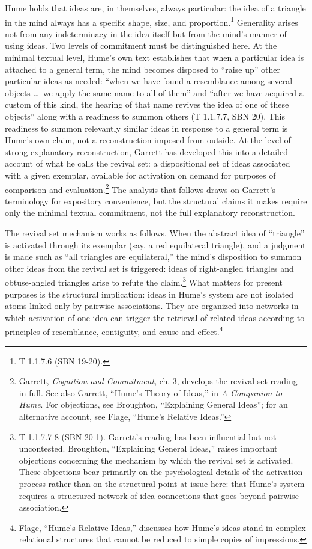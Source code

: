 \documentclass[11pt]{article}
\begin{document}
Hume holds that ideas are, in themselves, always particular: the idea of a triangle in the mind always has a specific shape, size, and proportion.\footnote{T 1.1.7.6 (SBN 19-20).} Generality arises not from any indeterminacy in the idea itself but from the mind's manner of using ideas. Two levels of commitment must be distinguished here. At the minimal textual level, Hume's own text establishes that when a particular idea is attached to a general term, the mind becomes disposed to ``raise up'' other particular ideas as needed: ``when we have found a resemblance among several objects \ldots\ we apply the same name to all of them'' and ``after we have acquired a custom of this kind, the hearing of that name revives the idea of one of these objects'' along with a readiness to summon others (T 1.1.7.7, SBN 20). This readiness to summon relevantly similar ideas in response to a general term is Hume's own claim, not a reconstruction imposed from outside. At the level of strong explanatory reconstruction, Garrett has developed this into a detailed account of what he calls the revival set: a dispositional set of ideas associated with a given exemplar, available for activation on demand for purposes of comparison and evaluation.\footnote{Garrett, \emph{Cognition and Commitment}, ch. 3, develops the revival set reading in full. See also Garrett, ``Hume's Theory of Ideas,'' in \emph{A Companion to Hume}. For objections, see Broughton, ``Explaining General Ideas''; for an alternative account, see Flage, ``Hume's Relative Ideas.''} The analysis that follows draws on Garrett's terminology for expository convenience, but the structural claims it makes require only the minimal textual commitment, not the full explanatory reconstruction.

The revival set mechanism works as follows. When the abstract idea of ``triangle'' is activated through its exemplar (say, a red equilateral triangle), and a judgment is made such as ``all triangles are equilateral,'' the mind's disposition to summon other ideas from the revival set is triggered: ideas of right-angled triangles and obtuse-angled triangles arise to refute the claim.\footnote{T 1.1.7.7-8 (SBN 20-1). Garrett's reading has been influential but not uncontested. Broughton, ``Explaining General Ideas,'' raises important objections concerning the mechanism by which the revival set is activated. These objections bear primarily on the psychological details of the activation process rather than on the structural point at issue here: that Hume's system requires a structured network of idea-connections that goes beyond pairwise association.} What matters for present purposes is the structural implication: ideas in Hume's system are not isolated atoms linked only by pairwise associations. They are organized into networks in which activation of one idea can trigger the retrieval of related ideas according to principles of resemblance, contiguity, and cause and effect.\footnote{Flage, ``Hume's Relative Ideas,'' discusses how Hume's ideas stand in complex relational structures that cannot be reduced to simple copies of impressions.}
\end{document}
